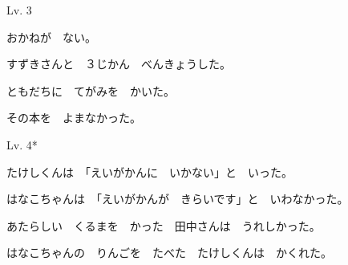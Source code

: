 	\begin{mondai}{Lv. 3}
		\item おかねが　ない。
		\item すずきさんと　３じかん\footnotemark[1]　べんきょうした。
		\item ともだちに　てがみを　かいた。
		\item その本を　よまなかった。
	\end{mondai}

	\begin{mondai}{Lv. 4*}
		\item たけしくんは　「えいがかんに　いかない」と　いった。
		\item はなこちゃんは　「えいがかんが　きらいです」と　いわなかった。
		\item あたらしい　くるまを　かった　田中さんは　うれしかった。
		\item はなこちゃんの　りんごを　たべた　たけしくんは　かくれた。
	\end{mondai}

